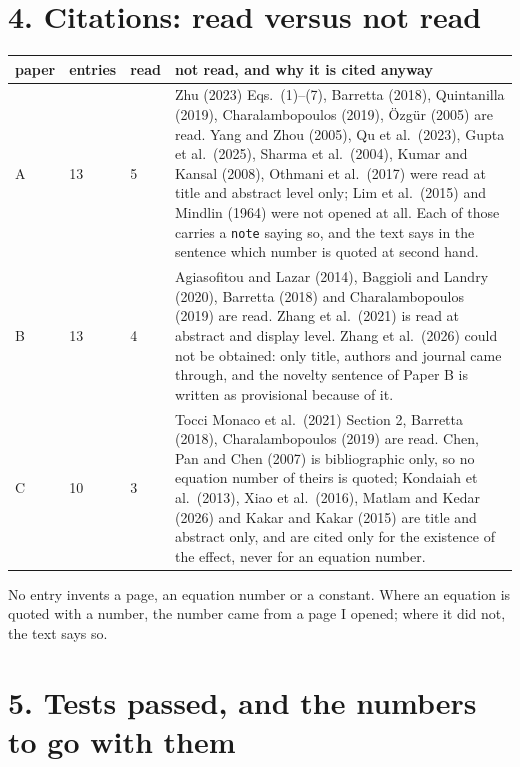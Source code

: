 \documentclass[11pt]{article}
\begin{document}
\section*{4. Citations: read versus not read}

\begin{center}
\begin{tabular}{p{2.0cm}p{1.4cm}p{1.4cm}p{8.6cm}}
\toprule
paper & entries & read & not read, and why it is cited anyway\\
\midrule
A & 13 & 5 & Zhu (2023) Eqs.~(1)--(7), Barretta (2018), Quintanilla (2019), Charalambopoulos (2019),
\"Ozg\"ur (2005) are read. Yang and Zhou (2005), Qu et al.\ (2023), Gupta et al.\ (2025), Sharma et al.\
(2004), Kumar and Kansal (2008), Othmani et al.\ (2017) were read at title and abstract level only; Lim et
al.\ (2015) and Mindlin (1964) were not opened at all. Each of those carries a \texttt{note} saying so, and
the text says in the sentence which number is quoted at second hand.\\
B & 13 & 4 & Agiasofitou and Lazar (2014), Baggioli and Landry (2020), Barretta (2018) and Charalambopoulos
(2019) are read. Zhang et al.\ (2021) is read at abstract and display level. Zhang et al.\ (2026) could not
be obtained: only title, authors and journal came through, and the novelty sentence of Paper B is written
as provisional because of it.\\
C & 10 & 3 & Tocci Monaco et al.\ (2021) Section 2, Barretta (2018), Charalambopoulos (2019) are read.
Chen, Pan and Chen (2007) is bibliographic only, so no equation number of theirs is quoted; Kondaiah et
al.\ (2013), Xiao et al.\ (2016), Matlam and Kedar (2026) and Kakar and Kakar (2015) are title and abstract
only, and are cited only for the existence of the effect, never for an equation number.\\
\bottomrule
\end{tabular}
\end{center}

No entry invents a page, an equation number or a constant. Where an equation is quoted with a number, the
number came from a page I opened; where it did not, the text says so.

\section*{5. Tests passed, and the numbers to go with them}
\end{document}
